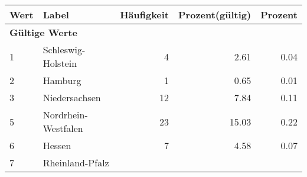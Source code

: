      \begin{longtable}{lXrrr}
     \toprule
     \textbf{Wert} & \textbf{Label} & \textbf{Häufigkeit} & \textbf{Prozent(gültig)} & \textbf{Prozent} \\
     \endhead
     \midrule
     \multicolumn{5}{l}{\textbf{Gültige Werte}}\\

     1 &
     \multicolumn{1}{X}{ Schleswig-Holstein   } &


       \num{4} &
       \num[round-mode=places,round-precision=2]{2,61} &
         \num[round-mode=places,round-precision=2]{0,04} \\

     2 &
     \multicolumn{1}{X}{ Hamburg   } &


       \num{1} &
       \num[round-mode=places,round-precision=2]{0,65} &
         \num[round-mode=places,round-precision=2]{0,01} \\

     3 &
     \multicolumn{1}{X}{ Niedersachsen   } &


       \num{12} &
       \num[round-mode=places,round-precision=2]{7,84} &
         \num[round-mode=places,round-precision=2]{0,11} \\

     5 &
     \multicolumn{1}{X}{ Nordrhein-Westfalen   } &


       \num{23} &
       \num[round-mode=places,round-precision=2]{15,03} &
         \num[round-mode=places,round-precision=2]{0,22} \\

     6 &
     \multicolumn{1}{X}{ Hessen   } &


       \num{7} &
       \num[round-mode=places,round-precision=2]{4,58} &
         \num[round-mode=places,round-precision=2]{0,07} \\

     7 &
     \multicolumn{1}{X}{ Rheinland-Pfalz   } &



\end{longtable}
